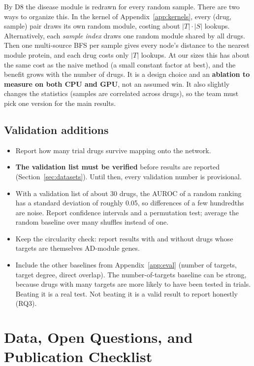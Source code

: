By D8 the disease module is redrawn for every random sample. There are two
ways to organize this. In the kernel of Appendix~\ref{app:kernels}, every
(drug, sample) pair draws its own random module, costing about $|T|\cdot|S|$
lookups. Alternatively, each \emph{sample index} draws one random module shared
by all drugs. Then one multi-source BFS per sample gives every node's distance
to the nearest module protein, and each drug costs only $|T|$ lookups. At our
sizes this has about the same cost as the naive method (a small constant
factor at best), and the benefit grows with the number of drugs. It is a design
choice and an \textbf{ablation to measure on both CPU and GPU}, not an assumed
win. It also slightly changes the statistics (samples are correlated across
drugs), so the team must pick one version for the main results.

\subsection{Validation additions}

\begin{itemize}[nosep]
  \item Report how many trial drugs survive mapping onto the network.
  \item \textbf{The validation list must be verified} before results are
        reported (Section~\ref{sec:datasets}). Until then, every validation
        number is provisional.
  \item With a validation list of about 30 drugs, the AUROC of a random
        ranking has a standard deviation of roughly 0.05, so differences of a
        few hundredths are noise. Report confidence intervals and a
        permutation test; average the random baseline over many shuffles
        instead of one.
  \item Keep the circularity check: report results with and without drugs
        whose targets are themselves AD-module genes.
  \item Include the other baselines from Appendix~\ref{app:eval} (number of
        targets, target degree, direct overlap). The number-of-targets
        baseline can be strong, because drugs with many targets are more
        likely to have been tested in trials. Beating it is a real test.
        Not beating it is a valid result to report honestly (RQ3).
\end{itemize}

\section{Data, Open Questions, and Publication Checklist}
\label{app:status}

